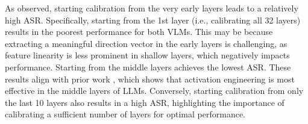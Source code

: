 As observed, starting calibration from the very early layers leads to a relatively high ASR. Specifically, starting from the 1st layer (i.e., calibrating all 32 layers) results in the poorest performance for both VLMs. This may be because extracting a meaningful direction vector in the early layers is challenging, as feature linearity is less prominent in shallow layers, which negatively impacts performance. Starting from the middle layers achieves the lowest ASR. These results align with prior work \cite{arditi2024refusal, panickssery2023steering}, which shows that activation engineering is most effective in the middle layers of LLMs. Conversely, starting calibration from only the last 10 layers also results in a high ASR, highlighting the importance of calibrating a sufficient number of layers for optimal performance.




